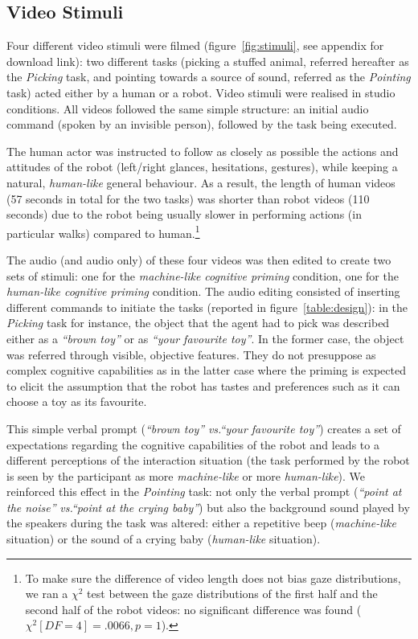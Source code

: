 \documentclass[lettersize, noapacite, twoside, HRI]{apa_HRI}
\newcommand{\vs}{\textit{vs.}\xspace}
\begin{document}
\subsection{Video Stimuli}

Four different video stimuli were filmed (figure~\ref{fig:stimuli}, see appendix
for download link): two
different tasks (picking a stuffed animal, referred hereafter as the
\emph{Picking} task, and pointing towards a source of sound, referred as the
\emph{Pointing} task) acted either by a human or a robot. Video stimuli were
realised in studio conditions. All videos followed the same simple structure: an
initial audio command (spoken by an invisible person), followed by the task
being executed.

The human actor was instructed to follow as closely as possible the actions and
attitudes of the robot (left/right glances, hesitations, gestures), while keeping a
natural, \emph{human-like} general behaviour. As a result, the length of human videos
(57 seconds in total for the two tasks) was shorter than robot videos (110
seconds) due to the robot being usually slower in performing actions (in
particular walks) compared to human.\footnote{To make sure the difference of
video length does not bias gaze distributions, we ran a $\chi^2$ test between
the gaze distributions of the first half and the second half of the robot
videos: no significant difference was found ($\chi^2[DF=4]=.0066, p=1$).}

The audio (and audio only) of these four videos was then edited to create two
sets of stimuli: one for the \emph{machine-like cognitive priming} condition, one for
the \emph{human-like cognitive priming} condition. The audio editing consisted of 
inserting different commands to initiate the tasks (reported in
figure~\ref{table:design}): in the \emph{Picking} task for instance, the object
that the agent had to pick was described either as a \emph{``brown toy''} or as
\emph{``your favourite toy''}. In the former case, the object was referred through
visible, objective features. They do not presuppose as complex cognitive capabilities
as in the latter case where the priming is expected to elicit the assumption
that the robot has tastes and preferences such as it can choose a toy as its favourite.

This simple verbal prompt (\emph{``brown toy''} \vs \emph{``your favourite
toy''}) creates a set of expectations regarding the cognitive capabilities of
the robot and leads to a different perceptions of the interaction situation (the
task performed by the robot is seen by the participant as more
\emph{machine-like} or more \emph{human-like}). We reinforced this effect in the
\emph{Pointing} task: not only the verbal prompt (\emph{``point at the noise''}
\vs \emph{``point at the crying baby''}) but also the background sound played by
the speakers during the task was altered: either a repetitive beep
(\emph{machine-like} situation) or the sound of a crying baby (\emph{human-like}
situation).
\end{document}
